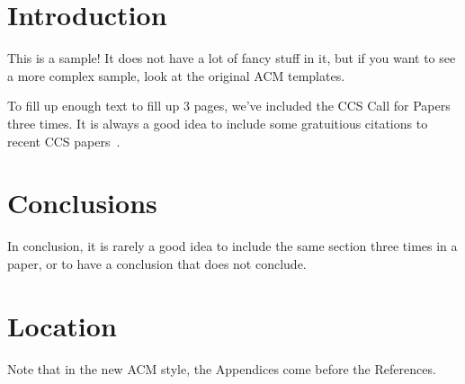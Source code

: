 \section{Introduction}

This is a sample!  It does not have a lot of fancy stuff in it, but if
you want to see a more complex sample, look at the original ACM
templates.

To fill up enough text to fill up 3 pages, we've included the CCS Call
for Papers three times.  It is always a good idea to include some
gratuitious citations to recent CCS papers~\cite{medvinsky1993netcash,
  bellare1993random, anderson1993cryptosystems, blaze1993cryptographic}.





\section{Conclusions}

In conclusion, it is rarely a good idea to include the same section three times in a paper, or to have a conclusion that does not conclude.

\appendix

\section{Location}

Note that in the new ACM style, the Appendices come before the References.



